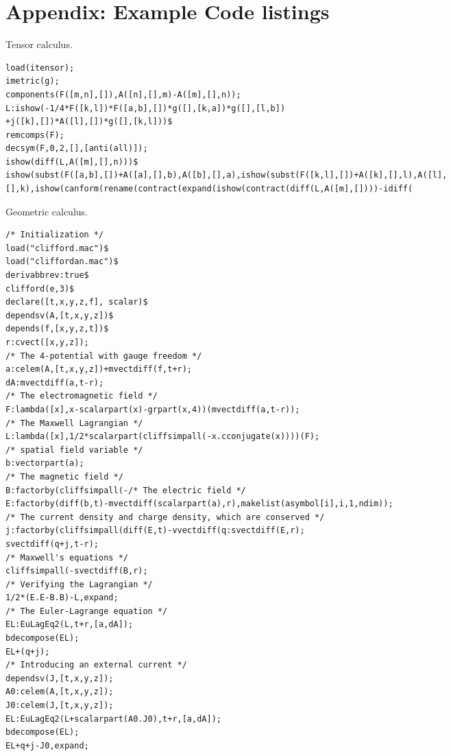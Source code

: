 \documentclass[twoside,reqno,11pt]{amsart}
\theoremstyle{definition}
\theoremstyle{remark}
\numberwithin{equation}{section}
\begin{document}
\appendix
\section*{Appendix: Example Code listings}

\begin{listing}\caption{\label{lst:tensor}Tensor calculus.}
{\color{labelcolor}\begin{verbatim}
load(itensor);
imetric(g);
components(F([m,n],[]),A([n],[],m)-A([m],[],n));
L:ishow(-1/4*F([k,l])*F([a,b],[])*g([],[k,a])*g([],[l,b])
+j([k],[])*A([l],[])*g([],[k,l]))$
remcomps(F);
decsym(F,0,2,[],[anti(all)]);
ishow(diff(L,A([m],[],n)))$
ishow(subst(F([a,b],[])+A([a],[],b),A([b],[],a),ishow(subst(F([k,l],[])+A([k],[],l),A([l],[],k),ishow(canform(rename(contract(expand(ishow(contract(diff(L,A([m],[])))-idiff(\end{verbatim}}
\end{listing}

\begin{listing}
\caption{\label{lst:geom}Geometric calculus.}
{\color{labelcolor}\begin{verbatim}
/* Initialization */
load("clifford.mac")$
load("cliffordan.mac")$
derivabbrev:true$
clifford(e,3)$
declare([t,x,y,z,f], scalar)$
dependsv(A,[t,x,y,z])$
depends(f,[x,y,z,t])$
r:cvect([x,y,z]);
/* The 4-potential with gauge freedom */
a:celem(A,[t,x,y,z])+mvectdiff(f,t+r);
dA:mvectdiff(a,t-r);
/* The electromagnetic field */
F:lambda([x],x-scalarpart(x)-grpart(x,4))(mvectdiff(a,t-r));
/* The Maxwell Lagrangian */
L:lambda([x],1/2*scalarpart(cliffsimpall(-x.cconjugate(x))))(F);
/* spatial field variable */
b:vectorpart(a);
/* The magnetic field */
B:factorby(cliffsimpall(-/* The electric field */
E:factorby(diff(b,t)-mvectdiff(scalarpart(a),r),makelist(asymbol[i],i,1,ndim));
/* The current density and charge density, which are conserved */
j:factorby(cliffsimpall(diff(E,t)-vvectdiff(q:svectdiff(E,r);
svectdiff(q+j,t-r);
/* Maxwell's equations */
cliffsimpall(-svectdiff(B,r);
/* Verifying the Lagrangian */
1/2*(E.E-B.B)-L,expand;
/* The Euler-Lagrange equation */
EL:EuLagEq2(L,t+r,[a,dA]);
bdecompose(EL);
EL+(q+j);
/* Introducing an external current */
dependsv(J,[t,x,y,z]);
A0:celem(A,[t,x,y,z]);
J0:celem(J,[t,x,y,z]);
EL:EuLagEq2(L+scalarpart(A0.J0),t+r,[a,dA]);
bdecompose(EL);
EL+q+j-J0,expand;
\end{verbatim}}
\end{listing}

\clearpage
\end{document}

